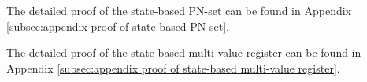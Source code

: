 The detailed proof of the state-based PN-set can be found in Appendix \ref{subsec:appendix proof of state-based PN-set}.

The detailed proof of the state-based multi-value register can be found in Appendix \ref{subsec:appendix proof of state-based multi-value register}.






